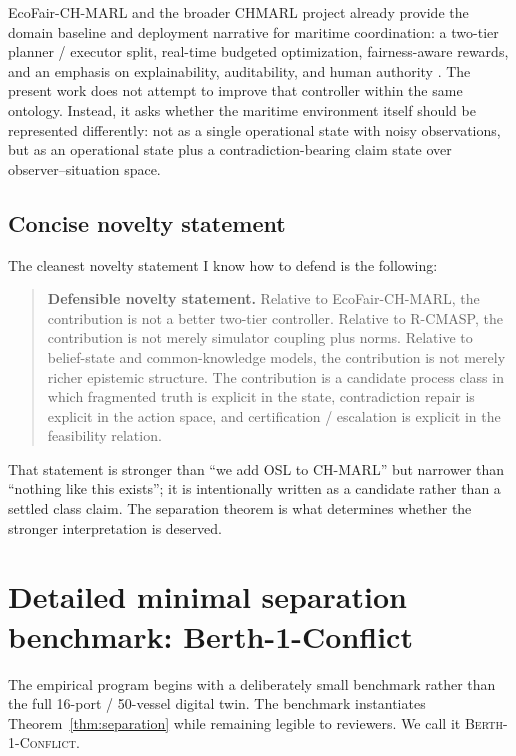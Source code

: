 \documentclass[11pt]{article}
\newcommand{\1}{\mathbf{1}}
\theoremstyle{definition}
\theoremstyle{plain}
\theoremstyle{remark}
\begin{document}
EcoFair-CH-MARL and the broader CHMARL project already provide the domain baseline and deployment narrative for maritime coordination: a two-tier planner / executor split, real-time budgeted optimization, fairness-aware rewards, and an emphasis on explainability, auditability, and human authority \citep{Alqithami2026EcoFair,Alqithami2025CHMARL}. The present work does not attempt to improve that controller within the same ontology. Instead, it asks whether the maritime environment itself should be represented differently: not as a single operational state with noisy observations, but as an operational state plus a contradiction-bearing claim state over observer--situation space.

\subsection{Concise novelty statement}

The cleanest novelty statement I know how to defend is the following:

\begin{quote}
\textbf{Defensible novelty statement.} Relative to EcoFair-CH-MARL, the contribution is not a better two-tier controller. Relative to R-CMASP, the contribution is not merely simulator coupling plus norms. Relative to belief-state and common-knowledge models, the contribution is not merely richer epistemic structure. The contribution is a candidate process class in which fragmented truth is explicit in the state, contradiction repair is explicit in the action space, and certification / escalation is explicit in the feasibility relation.
\end{quote}

That statement is stronger than ``we add OSL to CH-MARL'' but narrower than ``nothing like this exists''; it is intentionally written as a candidate rather than a settled class claim. The separation theorem is what determines whether the stronger interpretation is deserved.

\section{Detailed minimal separation benchmark: Berth-1-Conflict}
\label{supp:sec:benchmark}

The empirical program begins with a deliberately small benchmark rather than the full 16-port / 50-vessel digital twin. The benchmark instantiates Theorem~\ref{thm:separation} while remaining legible to reviewers. We call it \textsc{Berth-1-Conflict}.
\end{document}
